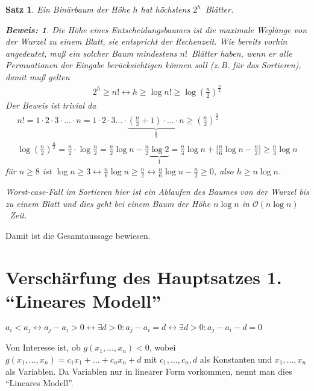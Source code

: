 \documentclass[ngerman,draft,parskip=half*,twoside]{scrreprt}
\theoremstyle{break}
\newtheorem{satz}{Satz}[chapter]
\theoremstyle{nonumberbreak}
\newtheorem{beweis}{Beweis:}
\newcommand*{\OO}{\mathcal{O}}      %
\begin{document}
\begin{satz}
  Ein Binärbaum der Höhe $h$ hat höchstens $ 2^h$~Blätter.
  \begin{beweis}
    Die Höhe eines Entscheidungsbaumes ist die maximale Weglänge von
    der Wurzel zu einem Blatt, sie entspricht der Rechenzeit. Wie
    bereits vorhin angedeutet, muß ein solcher Baum mindestens
    $n!$~Blätter haben, wenn er alle Permuationen der Eingabe
    berücksichtigen können soll (z.\,B. für das Sortieren), damit muß
    gelten
    \begin{gather*}
      2^h \geq n! \leftrightarrow h \geq \log n! \geq \log
      (\frac{n}{2})^{\frac{n}{2}}
    \end{gather*}
    Der Beweis ist trivial da
    \begin{gather*}
      n! = 1 \cdot 2 \cdot 3\cdot \ldots \cdot n = 1 \cdot 2 \cdot 3
      \ldots \cdot \underbrace{(\frac{n}{2}+1) \cdot \ldots \cdot
        n}_{\frac{n}{2}} \geq (\frac{n}{2})^{\frac{n}{2}}\\
      \log(\frac{n}{2})^{\frac{n}{2}} = \frac{n}{2} \cdot \log
      \frac{n}{2} = \frac{n}{2} \log n - \frac{n}{2} 
      \underbrace{\log 2}_{1} = \frac{n}{3} \log n + \lbrack
      \frac{n}{6} \log n - \frac{n}{2} \rbrack \geq \frac {n}{3} \log
      n
    \end{gather*}
    für $n\geq 8$ ist $\log n \geq 3 \leftrightarrow \frac{n}{6} \log
    n \geq \frac {n}{2} \leftrightarrow \frac{n}{6} \log n -
    \frac{n}{2} \geq 0$, also $h \geq n \log n$.

    Worst-case-Fall im Sortieren hier ist ein Ablaufen des Baumes von
    der Wurzel bis zu einem Blatt und dies geht bei einem Baum der
    Höhe $n \log n$ in $\OO(n \log n)$~Zeit.
  \end{beweis}
\end{satz} 

Damit ist die Gesamtaussage bewiesen.

\section{Verschärfung des Hauptsatzes 1. "`Lineares Modell"'}

$ a_i < a_j \leftrightarrow a_j - a_i > 0
\leftrightarrow \exists  d > 0 : a_j - a_i = d
\leftrightarrow \exists   d > 0 : a_j - a_i - d = 0 $ 


Von Interesse ist, ob $ g(x_1 , \dots , x_n) < 0 $, wobei $ g(x_1 , \dots , x_n) = c_1 x_1 + \dots + c_n x_n + d $ mit
$ c_1, \dots , c_n, d $ als Konstanten und $ x_1, \dots, x_n  $ als Variablen.
Da Variablen nur in linearer Form vorkommen, nennt man dies "`Lineares Modell"'.
\end{document}

